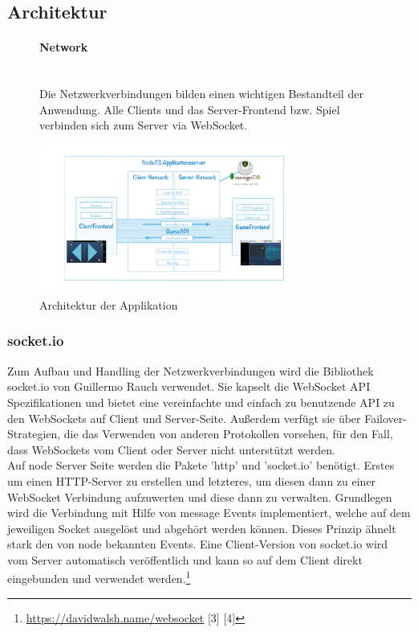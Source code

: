 \documentclass[a4paper]{spie}  %
\begin{document}
\subsection{Architektur}
\begin{figure}[H]
	\begin{minipage}[t]{0.4\textwidth}
		\vspace{0pt}
		\paragraph{Network}\mbox{}\\
		Die Netzwerkverbindungen bilden einen wichtigen Bestandteil der Anwendung. Alle Clients und das Server-Frontend bzw. Spiel verbinden sich zum Server via WebSocket.
	\end{minipage}
	\hfill
	\begin{minipage}[t]{0.5\textwidth}
		\vspace{0pt}
		\includegraphics[width=8.5cm]{images/arch/M113.png}
		\caption{Architektur der Applikation}
		\label{fig:test2}
	\end{minipage}
\end{figure}



\subsubsection{socket.io}\label{socketio}
Zum Aufbau und Handling der Netzwerkverbindungen wird die Bibliothek socket.io von Guillermo Rauch verwendet. Sie kapselt die WebSocket API Spezifikationen und bietet eine vereinfachte und einfach zu benutzende API zu den WebSockets auf Client und Server-Seite. Außerdem verfügt sie über Failover-Strategien, die das Verwenden von anderen Protokollen vorsehen, für den Fall, dass WebSockets vom Client oder Server nicht unterstützt werden.\\
Auf node Server Seite werden die Pakete 'http' und 'socket.io' benötigt. Erstes um einen HTTP-Server zu erstellen und letzteres, um diesen dann zu einer WebSocket Verbindung aufzuwerten und diese dann zu verwalten. Grundlegen wird die Verbindung mit Hilfe von message Events implementiert, welche auf dem jeweiligen Socket ausgelöst und abgehört werden können. Dieses Prinzip ähnelt stark den von node bekannten Events. Eine Client-Version von socket.io wird vom Server automatisch veröffentlich und kann so auf dem Client direkt eingebunden und
verwendet werden.\footnote{\url{https://davidwalsh.name/websocket} [3] [4]}
\end{document}
